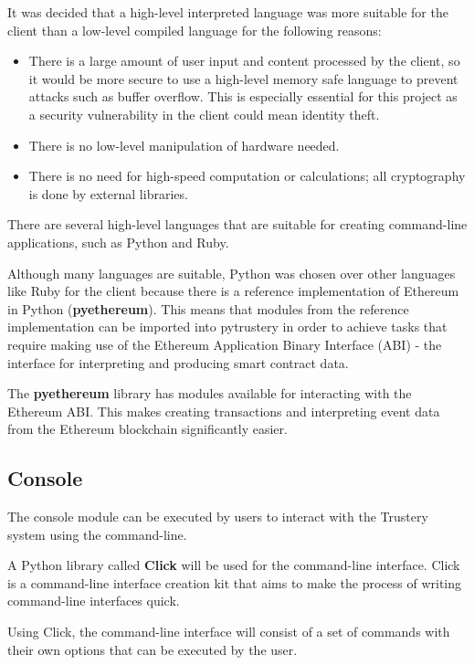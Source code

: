 \documentclass[12pt]{report}
\begin{document}
	It was decided that a high-level interpreted language was more suitable for the client than a low-level compiled language for the following reasons:
	\begin{itemize}
		\item There is a large amount of user input and content processed by the client, so it would be more secure to use a high-level memory safe language to prevent attacks such as buffer overflow. This is especially essential for this project as a security vulnerability in the client could mean identity theft.
		\item There is no low-level manipulation of hardware needed.
		\item There is no need for high-speed computation or calculations; all cryptography is done by external libraries.
	\end{itemize}
	
	There are several high-level languages that are suitable for creating command-line applications, such as Python and Ruby.
	
	Although many languages are suitable, Python was chosen over other languages like Ruby for the client because there is a reference implementation of Ethereum in Python (\textbf{pyethereum}).\cite{16} This means that modules from the reference implementation can be imported into pytrustery in order to achieve tasks that require making use of the Ethereum Application Binary Interface (ABI)\cite{14} - the interface for interpreting and producing smart contract data.
	
	The \textbf{pyethereum} library has modules available for interacting with the Ethereum ABI. This makes creating transactions and interpreting event data from the Ethereum blockchain significantly easier.
	
	\subsection{Console}
	The console module can be executed by users to interact with the Trustery system using the command-line.
	
	A Python library called \textbf{Click} will be used for the command-line interface. Click is a command-line interface creation kit that aims to make the process of writing command-line interfaces quick.\cite{17}
	
	Using Click, the command-line interface will consist of a set of commands with their own options that can be executed by the user.
	
\end{document}
